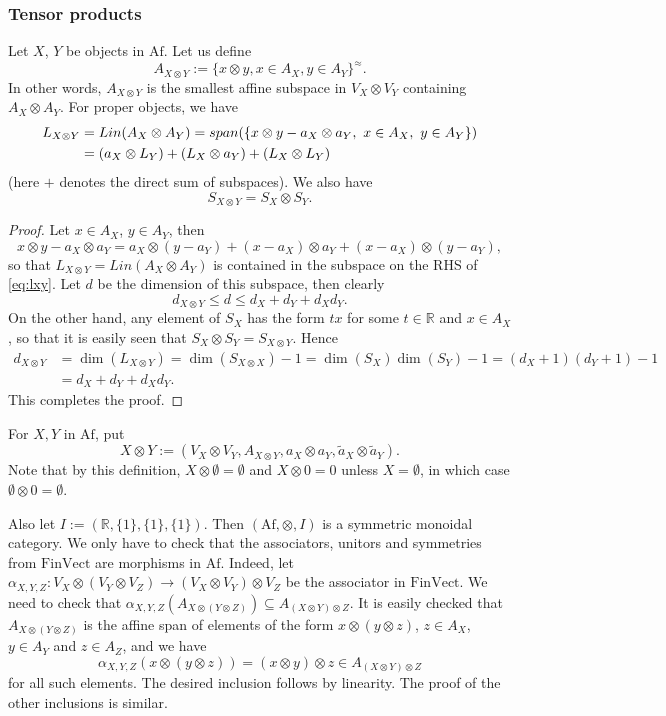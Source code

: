 \documentclass[12pt]{article}
\theoremstyle{definition}
\theoremstyle{remark}
\def \Af{\mathrm{Af}}
\def \FV{\mathrm{FinVect}}
\begin{document}
\subsubsection{Tensor products}

Let $X$, $Y$ be objects in $\Af$. Let us define
\[
A_{X\otimes Y}:=\{x\otimes y, x\in A_X, y\in A_Y\}^{\approx}.
\]
In other words, $A_{X\otimes Y}$ is the smallest affine subspace in $V_X\otimes V_Y$ containing
$A_X\otimes A_Y$. 
For proper objects, we  have
\begin{align}
L_{X\otimes Y}&=Lin(A_X\otimes A_Y)=span(\{x\otimes y-a_X\otimes a_Y,\ x\in A_X,\ y\in
A_Y\})\notag\\
&= (a_X\otimes L_Y)+ (L_X\otimes a_Y)+ (L_X\otimes L_Y)\label{eq:lxy}
\end{align}
(here $+$ denotes the direct sum of subspaces). We also have
\[
S_{X\otimes Y}=S_X\otimes S_Y.
\]

\begin{proof} Let $x\in A_X$, $y\in A_Y$, then
\[
x\otimes y-a_X\otimes a_Y=a_X\otimes (y-a_Y)+(x-a_X)\otimes a_Y+(x-a_X)\otimes (y-a_Y),
\]
so that $L_{X\otimes Y}=Lin(A_X\otimes A_Y)$ is contained in the subspace on the RHS of \eqref{eq:lxy}.
Let $d$ be the dimension of this subspace, then clearly
\[
d_{X\otimes Y}\le d\le d_X+d_Y+d_Xd_Y.
\]
On the other hand, any element of $S_X$ has the form $tx$ for some $t\in \mathbb R$ and
$x\in A_X$, so that it is easily seen that $S_X\otimes S_Y=S_{X\otimes Y}$. 
Hence 
\begin{align*}
d_{X\otimes Y}&=\dim(L_{X\otimes Y})=\dim(S_{X\otimes
X})-1=\dim(S_X)\dim(S_Y)-1=(d_X+1)(d_Y+1)-1\\
&=d_X+d_Y+d_Xd_Y.
\end{align*}
This completes the proof.

\end{proof}



For $X,Y$ in $\Af$, put 
\[
X\otimes Y:=(V_X\otimes V_Y,A_{X\otimes Y},a_X\otimes a_Y, \tilde
a_X\otimes \tilde a_Y).
\]
Note that by this definition, $X\otimes \emptyset =\emptyset$ and
$X\otimes 0=0$ unless $X=\emptyset$, in which case $\emptyset\otimes 0=\emptyset$. 


Also let $I:=(\mathbb R, \{1\},\{1\},\{1\})$. Then $(\Af,\otimes, I)$ is a symmetric
monoidal category. We only have to check that the associators, unitors and symmetries from
$\FV$ are morphisms in $\Af$. Indeed, let $\alpha_{X,Y,Z}:V_X\otimes (V_Y\otimes V_Z)\to
(V_X\otimes V_Y)\otimes V_Z$ be the associator in $\FV$. We need to check that
$\alpha_{X,Y,Z}(A_{X\otimes(Y\otimes Z)})\subseteq A_{(X\otimes Y)\otimes Z}$. It is easily
checked that $A_{X\otimes(Y\otimes Z)}$ is the affine span of elements of the form
$x\otimes (y\otimes z)$, $z\in A_X$, $y\in A_Y$ and $z\in A_Z$, and we have
\[
\alpha_{X,Y,Z}(x\otimes (y\otimes z))=(x\otimes y)\otimes z\in A_{(X\otimes Y)\otimes Z}
\]
for all such elements. The desired inclusion follows by linearity.
The proof of the other inclusions is similar.
\end{document}
